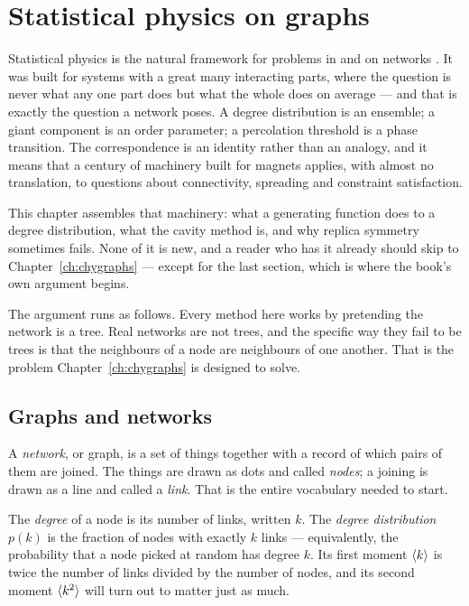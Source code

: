 \chapter{Statistical physics on graphs}
\label{ch:introduction}

Statistical physics is the natural framework for problems in and on networks
\citep{martin2001,dorogovtsev2008}. It was built for systems with a great many
interacting parts, where the question is never what any one part does but what
the whole does on average --- and that is exactly the question a network poses.
A degree distribution is an ensemble; a giant component is an order parameter; a
percolation threshold is a phase transition. The correspondence is an identity
rather than an analogy, and it means that a century of machinery built for
magnets applies, with almost no translation, to questions
about connectivity, spreading and constraint satisfaction.

This chapter assembles that machinery: what a generating function does to a
degree distribution, what the cavity method is, and why replica symmetry
sometimes fails. None of it is new, and a reader who has it already should skip
to Chapter~\ref{ch:chygraphs} --- except for the last section, which is where
the book's own argument begins.

The argument runs as follows. Every method here works by pretending the network
is a tree. Real networks are not trees, and the specific
way they fail to be trees is that the neighbours of a node are neighbours of
one another. That is the
problem Chapter~\ref{ch:chygraphs} is designed to solve.

\section{Graphs and networks}
\label{sec:networks}

A \emph{network}, or graph, is a set of things together with a record of which
pairs of them are joined. The things are drawn as dots and called \emph{nodes};
a joining is drawn as a line and called a \emph{link}. That is the entire
vocabulary needed to start.

The \emph{degree} of a node is its number of links, written $k$. The
\emph{degree distribution} $p(k)$ is the fraction of nodes with exactly $k$
links --- equivalently, the probability that a node picked at random has degree
$k$. Its first moment $\langle k \rangle$ is twice the number of links divided by the
number of nodes, and its second moment $\langle k^{2} \rangle$ will turn out to matter
just as much.

